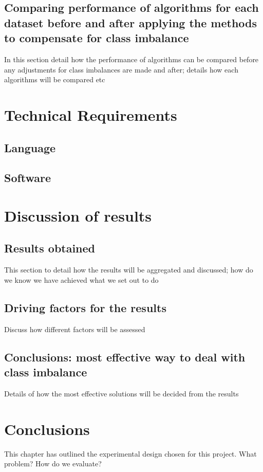 \subsection{Comparing performance of algorithms for each dataset before and after applying the methods to compensate for class imbalance}
In this section detail how the performance of algorithms can be compared before any adjustments for class imbalances are made and after; details how each algorithms will be compared etc

\section{Technical Requirements}
\subsection{Language}
\subsection{Software}

\section{Discussion of results}
\subsection{Results obtained}
This section to detail how the results will be aggregated and discussed; how do we know we have achieved what we set out to do
\subsection{Driving factors for the results}
Discuss how different factors will be assessed
\subsection{Conclusions: most effective way to deal with class imbalance}
Details of how the most effective solutions will be decided from the results




\section{Conclusions}

This chapter has outlined the experimental design chosen for this project. 
What problem?
How do we evaluate?



